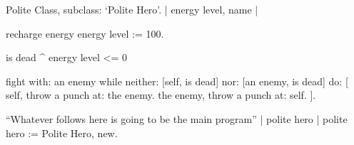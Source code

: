 Polite Class, subclass: ‘Polite Hero’. 
	| energy level, name |

	recharge energy 
		energy level := 100.

	is dead
		^ energy level <= 0

	fight with: an enemy
		while neither: [self, is dead] nor: [an enemy, is dead] do: [
			self, throw a punch at: the enemy.
			the enemy, throw a punch at: self.
		].

“Whatever follows here is going to be the main program”
| polite hero |
polite hero := Polite Hero, new.
